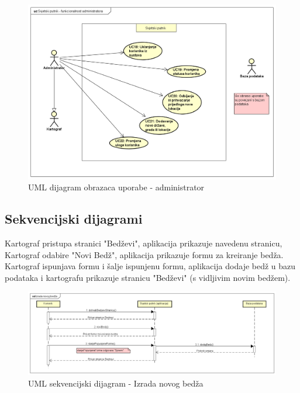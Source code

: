         				\begin{figure}[H]
                			\includegraphics[scale=0.4]{slike/UC-dministrator.png} %
                			\centering
                			\caption{UML dijagram obrazaca uporabe - administrator}
                			
                		\end{figure}
				\eject		
				
			\subsection{Sekvencijski dijagrami}
			
			
			    Kartograf pristupa stranici "Bedževi", aplikacija prikazuje navedenu stranicu, Kartograf odabire "Novi Bedž", aplikacija prikazuje formu za kreiranje bedža. Kartograf ispunjava formu i šalje ispunjenu formu, aplikacija dodaje bedž u bazu podataka i kartografu prikazuje stranicu "Bedževi" (s vidljivim novim bedžem).
				\begin{figure}[H]
                	\includegraphics[scale=0.4]{slike/SD-izradabedza.png} %
                	\centering
                	\caption{UML sekvencijski dijagram - Izrada novog bedža}
                			
                \end{figure}
                

